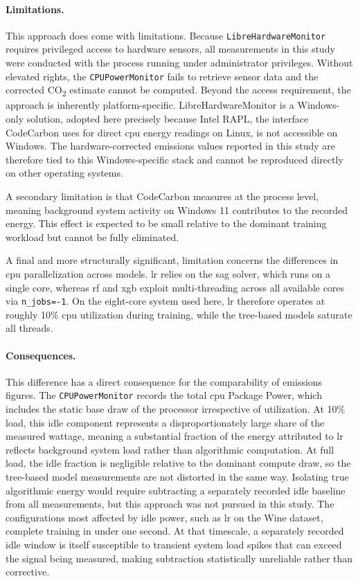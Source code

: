 \paragraph{Limitations.}
This approach does come with limitations. Because \texttt{LibreHardwareMonitor} requires privileged access to hardware sensors, all measurements in this study were conducted with the process running under administrator privileges. Without elevated rights, the \texttt{CPUPowerMonitor} fails to retrieve sensor data and the corrected CO\textsubscript{2} estimate cannot be computed. Beyond the access requirement, the approach is inherently platform-specific. LibreHardwareMonitor is a Windows-only solution, adopted here precisely because Intel RAPL, the interface CodeCarbon uses for direct \gls{cpu} energy readings on Linux, is not accessible on Windows. The hardware-corrected emissions values reported in this study are therefore tied to this Windows-specific stack and cannot be reproduced directly on other operating systems.

A secondary limitation is that CodeCarbon measures at the process level, meaning background system activity on Windows 11 contributes to the recorded energy. This effect is expected to be small relative to the dominant training workload but cannot be fully eliminated.

A final and more structurally significant, limitation concerns the differences in \gls{cpu} parallelization across models. \gls{lr} relies on the \gls{sag} solver, which runs on a single core, whereas \gls{rf} and \gls{xgb} exploit multi-threading across all available cores via \texttt{n\_jobs=-1}. On the eight-core system used here, \gls{lr} therefore operates at roughly 10\% \gls{cpu} utilization during training, while the tree-based models saturate all threads.

\paragraph{Consequences.}
This difference has a direct consequence for the comparability of emissions figures. The \texttt{CPUPowerMonitor} records the total \gls{cpu} Package Power, which includes the static base draw of the processor irrespective of utilization. At 10\% load, this idle component represents a disproportionately large share of the measured wattage, meaning a substantial fraction of the energy attributed to \gls{lr} reflects background system load rather than algorithmic computation. At full load, the idle fraction is negligible relative to the dominant compute draw, so the tree-based model measurements are not distorted in the same way. Isolating true algorithmic energy would require subtracting a separately recorded idle baseline from all measurements, but this approach was not pursued in this study. The configurations most affected by idle power, such as \gls{lr} on the Wine dataset, complete training in under one second. At that timescale, a separately recorded idle window is itself susceptible to transient system load spikes that can exceed the signal being measured, making subtraction statistically unreliable rather than corrective.

